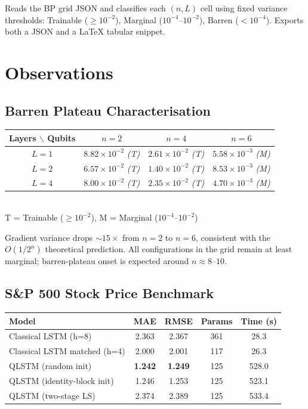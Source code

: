 \documentclass[10pt,twocolumn]{article}
\begin{document}
Reads the BP grid JSON and classifies each $(n, L)$ cell using fixed variance thresholds: Trainable ($\ge 10^{-2}$), Marginal ($10^{-4}$--$10^{-2}$), Barren ($< 10^{-4}$). Exports both a JSON and a \LaTeX{} tabular snippet.


\section{Observations}

\subsection*{Barren Plateau Characterisation}

\begin{center}
\begin{tabular}{@{}cccc@{}}
\toprule
\textbf{Layers} $\backslash$ \textbf{Qubits} & $n{=}2$ & $n{=}4$ & $n{=}6$ \\
\midrule
$L{=}1$ & $8.82\!\times\!10^{-2}$ \textit{(T)} & $2.61\!\times\!10^{-2}$ \textit{(T)} & $5.58\!\times\!10^{-3}$ \textit{(M)} \\
$L{=}2$ & $6.57\!\times\!10^{-2}$ \textit{(T)} & $1.40\!\times\!10^{-2}$ \textit{(T)} & $8.53\!\times\!10^{-3}$ \textit{(M)} \\
$L{=}4$ & $8.00\!\times\!10^{-2}$ \textit{(T)} & $2.35\!\times\!10^{-2}$ \textit{(T)} & $4.70\!\times\!10^{-3}$ \textit{(M)} \\
\bottomrule
\end{tabular}\\[3pt]
\small T = Trainable ($\ge 10^{-2}$), M = Marginal ($10^{-4}$--$10^{-2}$)
\end{center}

Gradient variance drops ${\sim}15\times$ from $n{=}2$ to $n{=}6$, consistent with the $O(1/2^n)$ theoretical prediction. All configurations in the grid remain at least marginal; barren-plateau onset is expected around $n \approx 8$--$10$.

\subsection*{S\&P 500 Stock Price Benchmark}

\begin{center}
\begin{tabular}{@{}lcccc@{}}
\toprule
\textbf{Model} & \textbf{MAE} & \textbf{RMSE} & \textbf{Params} & \textbf{Time (s)} \\
\midrule
Classical LSTM (h=8)          & 2.363 & 2.367 & 361 & 28.3 \\
Classical LSTM matched (h=4)  & 2.000 & 2.001 & 117 & 26.3 \\
QLSTM (random init)           & \textbf{1.242} & \textbf{1.249} & 125 & 528.0 \\
QLSTM (identity-block init)   & 1.246 & 1.253 & 125 & 523.1 \\
QLSTM (two-stage LS)          & 2.374 & 2.389 & 125 & 533.4 \\
\bottomrule
\end{tabular}
\end{center}
\end{document}

